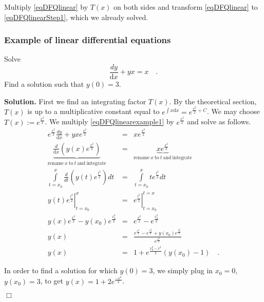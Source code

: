 \documentclass[12pt]{book}
\newcommand{\diff}{\text{d}}
\newenvironment{solution}{\textbf{Solution.} }{$\Box$}
\newcommand{\optionalDisplay}[1]{}
\begin{document}
Multiply \eqref{eqDFQlinear} by $T(x)$ on both sides and transform \eqref{eqDFQlinear} to \eqref{eqDFQlinearStep1}, which we already solved.
\subsubsection{Example of linear differential equations}
Solve 
\begin{equation}\label{eqDFQlinearexample1}
\frac{dy}{\diff x}+ y x=x\quad .
\end{equation} Find a solution such that $y(0)=3$.

\begin{solution}
First we find an integrating factor $T(x)$. By the theoretical section, $T(x)$ is up to a multiplicative constant equal to $e^{\int x \diff x}= e^{\frac{x^2}2 +C}$. We may choose $T(x):= e^{\frac{x^2}2}$. We multiply \eqref{eqDFQlinearexample1} by $e^{\frac{x^2}2}$ and solve as follows.
\[
\begin{array}{rcl}
\displaystyle e^{\frac{x^2}2}\frac{dy}{\diff x}+ yxe^{\frac{x^2}2}&=&\displaystyle xe^{\frac{x^2}2}\\
\underbrace{\frac{d}{\diff x} \left(y(x) e^{\frac{x^2}2} \right)}_{\mathrm{rename~}x~\mathrm{to~}t\mathrm{~and~integrate}}&=&\underbrace{xe^{\frac{x^2}2}}_{\mathrm{rename~}x\mathrm{~to~}t\mathrm{~and~integrate}}\\
\displaystyle\int\limits_{t=x_0}^x \frac{d}{dt} \left(y(t) e^{\frac{t^2}2}\right) dt &=&\displaystyle \int\limits_{t=x_0}^x  te^{\frac{t^2}2}dt\\
\displaystyle\left.y(t) e^{\frac{t^2}2}\right|_{t=x_0}^x&=&\displaystyle \left.e^{\frac{t^2}2}\right|_{t=x_0}^{t=x}\\
\displaystyle y(x)e^{\frac{x^2}2}- y(x_0)e^{\frac{x_0^2}2}&=&\displaystyle e^{\frac{x^2}2}- e^{\frac{x_0^2}2}\\
y(x)&=&\displaystyle \frac{e^{\frac{x^2}2}- e^{\frac{x_0^2}2}+ y(x_0)e^{\frac{x_0^2}2}}{e^{\frac{x^2}2}}\\
y(x)&=&\displaystyle 1+{e^{\frac{x_0^2-x^2}2}}(y(x_0)-1)\quad.
\end{array}
\]

In order to find a solution for which $y(0)=3$, we simply plug in $x_0=0$, $y(x_0)=3$, to get $y(x)=1+2e^{\frac{-x^2}2}$.

\optionalDisplay{
\begin{pspicture}(-5,-5)(5,5)
\psaxes{<->}(0,0)(-5,-5)(5,5)
\newcommand{\Xstart}{1}
\newcommand{\Ystart}{1}
\psplot[linecolor=green]{-4}{4}{ 2.718281828 \Xstart\space \Xstart\space mul x x mul sub exp \Ystart\space 1 sub mul 1 add} 
\renewcommand{\Xstart}{0}
\renewcommand{\Ystart}{-1}
\psplot[linecolor=green]{-4}{4}{ 2.718281828 \Xstart\space \Xstart\space mul x x mul sub exp \Ystart\space 1 sub mul 1 add} 
\renewcommand{\Xstart}{0}
\renewcommand{\Ystart}{3}
\psplot[linecolor=green]{-4}{4}{ 2.718281828 \Xstart\space \Xstart\space mul x x mul sub exp \Ystart\space 1 sub mul 1 add} 


\end{pspicture}}
\end{solution}
\end{document}
